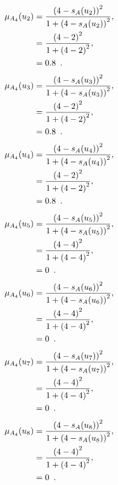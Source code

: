 \documentclass[a4paper,openany]{book}
\begin{document}
				\begin{align}
					\mu_{A_4}(u_2) &= \frac{\left(4-s_A(u_2)\right)^2}{1 + \left(4-s_A(u_2)\right)^2} ,\\
					&= \frac{\left(4-2\right)^2}{1 + \left(4-2\right)^2} \notag ,\\
					&= 0.8 \enspace. \notag
				\end{align}
				\begin{align}
					\mu_{A_4}(u_3) &= \frac{\left(4-s_A(u_3)\right)^2}{1 + \left(4-s_A(u_3)\right)^2} ,\\
					&= \frac{\left(4-2\right)^2}{1 + \left(4-2\right)^2} \notag ,\\
					&= 0.8 \enspace. \notag
				\end{align}
				\begin{align}
					\mu_{A_4}(u_4) &= \frac{\left(4-s_A(u_4)\right)^2}{1 + \left(4-s_A(u_4)\right)^2} ,\\
					&= \frac{\left(4-2\right)^2}{1 + \left(4-2\right)^2} \notag ,\\
					&= 0.8 \enspace. \notag
				\end{align}
				\begin{align}
					\mu_{A_4}(u_5) &= \frac{\left(4-s_A(u_5)\right)^2}{1 + \left(4-s_A(u_5)\right)^2} ,\\
					&= \frac{\left(4-4\right)^2}{1 + \left(4-4\right)^2} \notag ,\\
					&= 0 \enspace. \notag
				\end{align}
				\begin{align}
					\mu_{A_4}(u_6) &= \frac{\left(4-s_A(u_6)\right)^2}{1 + \left(4-s_A(u_6)\right)^2} ,\\
					&= \frac{\left(4-4\right)^2}{1 + \left(4-4\right)^2} \notag ,\\
					&= 0 \enspace. \notag
				\end{align}
				\begin{align}
					\mu_{A_4}(u_7) &= \frac{\left(4-s_A(u_7)\right)^2}{1 + \left(4-s_A(u_7)\right)^2} ,\\
					&= \frac{\left(4-4\right)^2}{1 + \left(4-4\right)^2} \notag ,\\
					&= 0 \enspace. \notag
				\end{align}
				\begin{align}
					\mu_{A_4}(u_8) &= \frac{\left(4-s_A(u_8)\right)^2}{1 + \left(4-s_A(u_8)\right)^2} ,\\
					&= \frac{\left(4-4\right)^2}{1 + \left(4-4\right)^2} \notag ,\\
					&= 0 \enspace. \notag
				\end{align}
\end{document}
